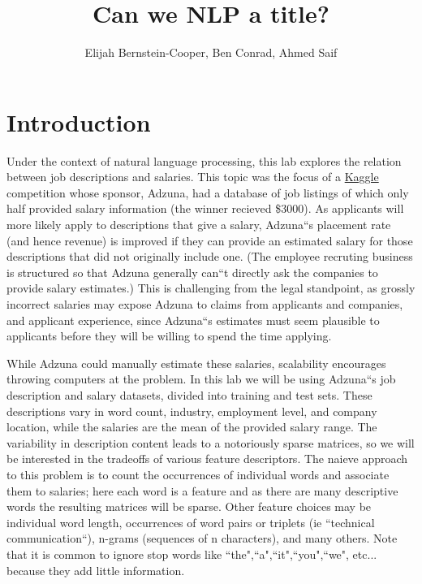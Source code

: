 \documentclass[12pt]{article}
\begin{document}
\title{Can we NLP a title?}

\author{
Elijah Bernstein-Cooper, Ben Conrad, Ahmed Saif
}
\maketitle

\section{Introduction}

    Under the context of natural language processing, this lab explores the
    relation between job descriptions and salaries.  This topic was the focus
    of a \href{http://www.kaggle.com/c/job-salary-prediction}{Kaggle}
    competition whose sponsor, Adzuna, had a database of job listings of which
    only half provided salary information (the winner recieved \$3000).  As
    applicants will more likely apply to descriptions that give a salary,
    Adzuna``s placement rate (and hence revenue) is improved if they can provide
    an estimated salary for those descriptions that did not originally include
    one.  (The employee recruting business is structured so that Adzuna
    generally can``t directly ask the companies to provide salary estimates.)
    This is challenging from the legal standpoint, as grossly incorrect
    salaries may expose Adzuna to claims from applicants and companies, and
    applicant experience, since Adzuna``s estimates must seem plausible to
    applicants before they will be willing to spend the time applying.

    While Adzuna could manually estimate these salaries, scalability encourages
    throwing computers at the problem.  In this lab we will be using Adzuna``s
    job description and salary datasets, divided into training and test sets.
    These descriptions vary in word count, industry, employment level, and
    company location, while the salaries are the mean of the provided salary
    range.  The variability in description content leads to a notoriously
    sparse matrices, so we will be interested in the tradeoffs of various
    feature descriptors.  The naieve approach to this problem is to count the
    occurrences of individual words and associate them to salaries; here each
    word is a feature and as there are many descriptive words the resulting
    matrices will be sparse.  Other feature choices may be individual word
    length, occurrences of word pairs or triplets (ie ``technical
    communication``), n-grams (sequences of n characters), and many others.
    Note that it is common to ignore stop words like
    ``the",``a",``it",``you",``we", etc... because they add little information.
\end{document}
